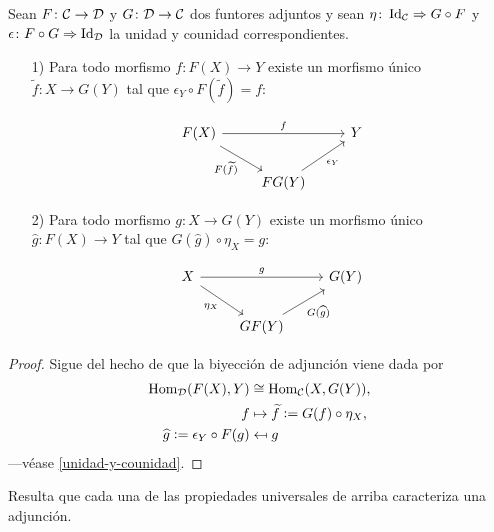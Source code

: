 \documentclass{article}
\numberwithin{equation}{section}
\theoremstyle{definition}
\begin{document}
\begin{observacion}
  Sean $F\colon \mathcal{C}\to\mathcal{D}$ y $G\colon \mathcal{D}\to\mathcal{C}$ dos
  funtores adjuntos y sean $\eta\colon \operatorname{Id}_\mathcal{C} \Rightarrow G\circ F$ y
  $\epsilon\colon F\circ G\Rightarrow \operatorname{Id}_\mathcal{D}$ la unidad y counidad
  correspondientes.

\begin{enumerate}
\item[1)] Para todo morfismo $f\colon F (X) \to Y$ existe un morfismo único
  $\widetilde{f}\colon X\to G (Y)$ tal que
  $\epsilon_Y \circ F (\widetilde{f}) = f$:

  \[ \begin{tikzcd}
      F (X)\ar{rr}{f}\ar{dr}[swap]{F (\widetilde{f})} & & Y \\
      & FG (Y)\ar{ur}[swap]{\epsilon_Y}
    \end{tikzcd} \]

\item[2)] Para todo morfismo $g\colon X\to G (Y)$ existe un morfismo único
  $\widehat{g}\colon F (X) \to Y$ tal que $G (\widehat{g})\circ \eta_X = g$:

  \[ \begin{tikzcd}
      X\ar{rr}{g}\ar{dr}[swap]{\eta_X} & & G (Y) \\
      & GF (Y)\ar{ur}[swap]{G (\widehat{g})}
    \end{tikzcd} \]
\end{enumerate}

\begin{proof}
  Sigue del hecho de que la biyección de adjunción viene dada por
  \begin{align*}
    \operatorname{Hom}_\mathcal{D} (F (X), Y) & \cong \operatorname{Hom}_\mathcal{C} (X, G (Y)),\\
    f & \mapsto \widetilde{f} \mathrel{\mathop:}= G (f)\circ \eta_X,\\
    \widehat{g} \mathrel{\mathop:}= \epsilon_Y\circ F (g) & \mapsfrom g
  \end{align*}
  ---véase \ref{unidad-y-counidad}.
\end{proof}
\end{observacion}

Resulta que cada una de las propiedades universales de arriba caracteriza una
adjunción.
\end{document}
